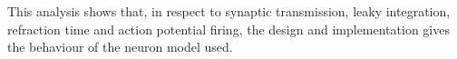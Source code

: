 	This analysis shows that, in respect to synaptic transmission, leaky integration, refraction time and action potential firing, the design and implementation gives the behaviour of the neuron model used. 





	
	











